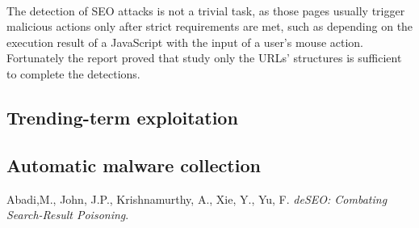 \documentclass[pdftex,a4paper,12pt]{article}
\begin{document}
\paragraph*{}
The detection of SEO attacks is not a trivial task, as those pages usually trigger malicious actions only after strict requirements are met, such as depending on the execution result of a JavaScript with the input of a user's mouse action. Fortunately the report proved that study only the URLs' structures is sufficient to complete the detections. 


\subsection*{Trending-term exploitation}


\subsection*{Automatic malware collection}


\newpage
\begin{thebibliography}{99}
\raggedright
{}
Abadi,M., John, J.P., Krishnamurthy, A., Xie, Y., Yu, F. \textit{deSEO: Combating Search-Result Poisoning}.

\end{thebibliography}
\end{document}

